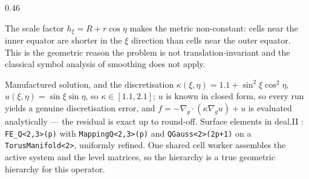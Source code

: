 \begin{columns}[T]
\begin{column}{0.46\textwidth}
\vspace{2mm}
\raggedright
{\scriptsize The scale factor $h_\xi = R+r\cos\eta$ makes the metric \alert{non-constant}:
cells near the inner equator are shorter in the $\xi$ direction than cells near the outer
equator. This is the geometric reason the problem is not translation-invariant and the
classical symbol analysis of smoothing does not apply.}

\vspace{2mm}
\begin{block}{Manufactured solution, and the discretisation}
{\scriptsize
$\kappa(\xi,\eta)=1.1+\sin^2\xi\cos^2\eta$, $u(\xi,\eta)=\sin\xi\sin\eta$, so
$\kappa\in[1.1,2.1]$; $u$ is known in closed form, so every run yields a genuine
discretisation error, and $f=-\nabla_g\!\cdot(\kappa\nabla_g u)+u$ is evaluated
\alert{analytically} --- the residual is exact up to round-off. Surface elements
\cite{DziukElliott,Demlow} in deal.II \cite{dealii}: \texttt{FE\_Q<2,3>(p)} with
\texttt{MappingQ<2,3>(p)} and \texttt{QGauss<2>(2p+1)} on a \texttt{TorusManifold<2>},
uniformly refined. One shared cell worker assembles the active system and the level
matrices, so the hierarchy is a true geometric hierarchy for this operator.}
\end{block}
\end{column}
\end{columns}
